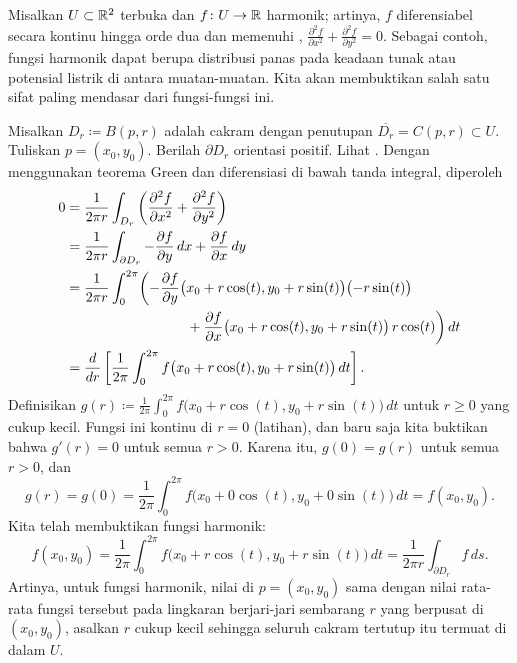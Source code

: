 \begin{example}
Misalkan $U \subset {\mathbb{R}}^2$ terbuka dan
$f \colon U \to {\mathbb{R}}$ harmonik; artinya, $f$ diferensiabel secara kontinu hingga
orde dua dan memenuhi \emph{},
$\frac{\partial^2 f}{\partial x^2} +
\frac{\partial^2 f}{\partial y^2} = 0$.
Sebagai contoh, fungsi harmonik dapat berupa distribusi panas pada keadaan tunak
atau potensial listrik di antara muatan-muatan.
Kita akan membuktikan salah satu sifat paling mendasar dari fungsi-fungsi ini.

Misalkan $D_r \coloneqq B(p,r)$ adalah cakram dengan penutupan
$\overline{D_r} = C(p,r) \subset U$. Tuliskan
$p = (x_0,y_0)$. Berilah $\partial D_r$ orientasi positif.
Lihat .
Dengan menggunakan teorema Green dan diferensiasi di bawah tanda integral,
diperoleh
\begin{equation*}
\begin{split}
0
& =
\frac{1}{2\pi r}
\int_{D_r}
\left(
\frac{\partial^2 f}{\partial x^2} +
\frac{\partial^2 f}{\partial y^2}
\right)
\\
& 
=
\frac{1}{2\pi r}
\int_{\partial D_r}
- \frac{\partial f}{\partial y} \, dx + 
\frac{\partial f}{\partial x} \, dy
\\
&
=
\frac{1}{2\pi r}
\int_0^{2\pi}
\biggl(
- \frac{\partial f}{\partial y} \bigl(x_0+r\cos(t),y_0+r\sin(t)\bigr) \bigl(-r\sin(t)\bigr)
\\
& \hspace{1.2in}
+ \frac{\partial f}{\partial x} \bigl(x_0+r\cos(t),y_0+r\sin(t)\bigr) \, r\cos(t)
\biggr) \, dt
\\
&
=
\frac{d}{dr}
\left[
\frac{1}{2\pi}
\int_0^{2\pi}
f\bigl(x_0+r\cos(t),y_0+r\sin(t)\bigr) \, dt
\right] .
\end{split}
\end{equation*}
Definisikan $g(r) \coloneqq 
\frac{1}{2\pi}
\int_0^{2\pi}
f\bigl(x_0+r\cos(t),y_0+r\sin(t)\bigr) \, dt$ untuk $r \geq 0$ yang cukup kecil.
Fungsi ini kontinu di $r=0$ (latihan), dan baru saja kita buktikan bahwa
$g'(r) = 0$ untuk semua $r > 0$.
Karena itu, $g(0) = g(r)$ untuk semua $r > 0$, dan
\begin{equation*}
g(r) = g(0) = 
\frac{1}{2\pi}
\int_0^{2\pi}
f\bigl(x_0+0\cos(t),y_0+0\sin(t)\bigr) \, dt
=
f(x_0,y_0).
\end{equation*}
Kita telah membuktikan \emph{} fungsi harmonik:
\begin{equation*}
f(x_0,y_0) = 
\frac{1}{2\pi}
\int_0^{2\pi}
f\bigl(x_0+r\cos(t),y_0+r\sin(t)\bigr) \, dt 
=
\frac{1}{2\pi r}
\int_{\partial D_r} f \, ds .
\end{equation*}
Artinya, untuk fungsi harmonik, nilai di $p = (x_0,y_0)$ sama dengan nilai
rata-rata fungsi tersebut pada lingkaran berjari-jari sembarang $r$ yang berpusat
di $(x_0,y_0)$, asalkan $r$ cukup kecil sehingga seluruh cakram tertutup itu
termuat di dalam $U$.
\end{example}

